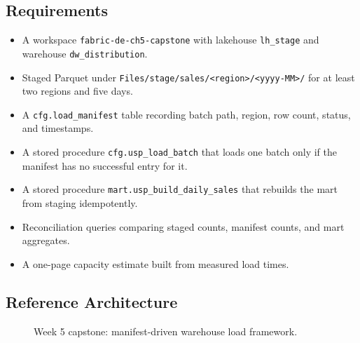 \subsection*{Requirements}
\begin{itemize}
    \item A workspace \texttt{fabric-de-ch5-capstone} with lakehouse \texttt{lh\_stage} and warehouse \texttt{dw\_distribution}.
    \item Staged Parquet under \texttt{Files/stage/sales/<region>/<yyyy-MM>/} for at least two regions and five days.
    \item A \texttt{cfg.load\_manifest} table recording batch path, region, row count, status, and timestamps.
    \item A stored procedure \texttt{cfg.usp\_load\_batch} that loads one batch only if the manifest has no successful entry for it.
    \item A stored procedure \texttt{mart.usp\_build\_daily\_sales} that rebuilds the mart from staging idempotently.
    \item Reconciliation queries comparing staged counts, manifest counts, and mart aggregates.
    \item A one-page capacity estimate built from measured load times.
\end{itemize}

\subsection*{Reference Architecture}
\begin{figure}[H]
    \centering
    \caption{Week 5 capstone: manifest-driven warehouse load framework.}
    \label{fig:chapter5-capstone-architecture}
\end{figure}

